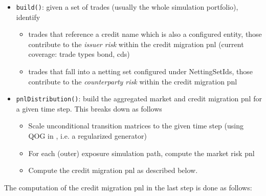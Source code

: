 \documentclass[12pt, a4paper]{article}
\begin{document}
\begin{itemize}
\item \verb+build()+: given a set of trades (usually the whole simulation portfolio), identify
  \begin{itemize}
    \item trades that reference a credit name which is also a configured entity, those contribute to the {\em issuer
      risk} within the credit migration pnl (current coverage: trade types bond, cds)
    \item trades that fall into a netting set configured under NettingSetIds, those contribute to the {\em counterparty
      risk} within the credit migration pnl
  \end{itemize}
\item \verb+pnlDistribution()+: build the aggregated market and credit migration pnl for a given time step. This breaks down as follows
  \begin{itemize}
  \item Scale unconditional transition matrices to the given time step (using QOG in \cite{Kreinin2001}, i.e. a regularized generator)
  \item For each (outer) exposure simulation path, compute the market risk pnl
  \item Compute the credit migration pnl as described below.
  \end{itemize}
\end{itemize}

The computation of the credit migration pnl in the last step is done as follows:
\end{document}
